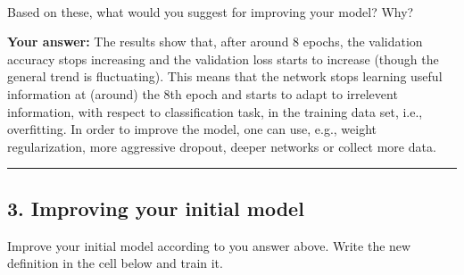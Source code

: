 \documentclass[11pt]{article}
\begin{document}
    \begin{center}
    \end{center}
    { \hspace*{\fill} \\}
    
    Based on these, what would you suggest for improving your model? Why?

    \textbf{Your answer:} The results show that, after around 8 epochs, the
validation accuracy stops increasing and the validation loss starts to
increase (though the general trend is fluctuating). This means that the
network stops learning useful information at (around) the 8th epoch and
starts to adapt to irrelevent information, with respect to
classification task, in the training data set, i.e., overfitting. In
order to improve the model, one can use, e.g., weight regularization,
more aggressive dropout, deeper networks or collect more data.

    \begin{center}\rule{0.5\linewidth}{\linethickness}\end{center}

\subsection{3. Improving your initial
model}\label{improving-your-initial-model}

    Improve your initial model according to you answer above. Write the new
definition in the cell below and train it.
\end{document}
